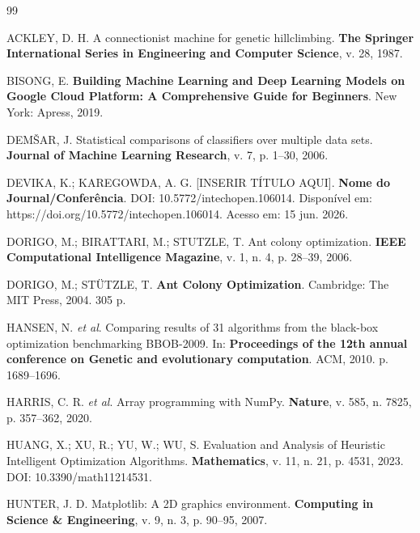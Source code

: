 \documentclass[12pt, a4paper, oneside]{report}
\begin{document}
\begin{flushleft}
\begin{thebibliography}{99}

ACKLEY, D. H. A connectionist machine for genetic hillclimbing. \textbf{The Springer International Series in Engineering and Computer Science}, v. 28, 1987.

BISONG, E. \textbf{Building Machine Learning and Deep Learning Models on Google Cloud Platform: A Comprehensive Guide for Beginners}. New York: Apress, 2019.

DEMŠAR, J. Statistical comparisons of classifiers over multiple data sets. \textbf{Journal of Machine Learning Research}, v. 7, p. 1--30, 2006.

DEVIKA, K.; KAREGOWDA, A. G. [INSERIR TÍTULO AQUI]. \textbf{Nome do Journal/Conferência}. DOI: 10.5772/intechopen.106014. Disponível em: https://doi.org/10.5772/intechopen.106014. Acesso em: 15 jun. 2026.

DORIGO, M.; BIRATTARI, M.; STUTZLE, T. Ant colony optimization. \textbf{IEEE Computational Intelligence Magazine}, v. 1, n. 4, p. 28--39, 2006.

DORIGO, M.; STÜTZLE, T. \textbf{Ant Colony Optimization}. Cambridge: The MIT Press, 2004. 305 p.

HANSEN, N. \textit{et al}. Comparing results of 31 algorithms from the black-box optimization benchmarking BBOB-2009. In: \textbf{Proceedings of the 12th annual conference on Genetic and evolutionary computation}. ACM, 2010. p. 1689--1696.

HARRIS, C. R. \textit{et al}. Array programming with NumPy. \textbf{Nature}, v. 585, n. 7825, p. 357--362, 2020.

HUANG, X.; XU, R.; YU, W.; WU, S. Evaluation and Analysis of Heuristic Intelligent Optimization Algorithms. \textbf{Mathematics}, v. 11, n. 21, p. 4531, 2023. DOI: 10.3390/math11214531.

HUNTER, J. D. Matplotlib: A 2D graphics environment. \textbf{Computing in Science \& Engineering}, v. 9, n. 3, p. 90--95, 2007.


\end{thebibliography}
\end{flushleft}
\end{document}
